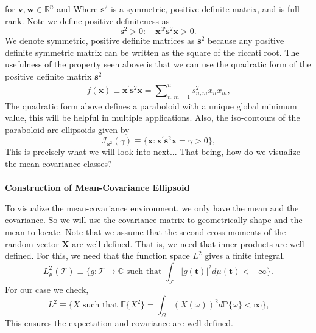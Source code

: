 \documentclass[../main.tex]{subfiles}
\begin{document}
for $\mathbf{v,w} \in \mathbb{R}^n$ and Where
$\mathbf{s}^2$ is a symmetric, positive definite matrix, and 
is full rank. Note we define positive definiteness as
\[
\mathbf{s}^2 > 0: \quad \mathbf{x^T}\mathbf{s}^2\mathbf{x} > 0.
\]
We denote symmetric, positive definite matrices
as $\mathbf{s}^2$ because any positive definite symmetric 
matrix can be written as the square of the riccati root. 
The usefulness of the property seen above is 
that we can use the quadratic form of the positive definite matrix $\mathbf{s}^2$
\begin{equation}
    f(\boldsymbol{x})\equiv\boldsymbol{x}^{\prime}\boldsymbol{s}^{2}\boldsymbol{x}={\textstyle\sum\nolimits_{n,m=1}^{\bar{n}}} s_{n,m}^{2}x_{n}x_{m}\text{,}
    \end{equation}
The quadratic form above defines a paraboloid
with a unique global minimum value, this will
be helpful in multiple applications.
Also, the iso-contours of the paraboloid
are ellipsoids given by 
\begin{equation}
    \mathcal{I}_{\boldsymbol{s}^{2}}(\gamma)\equiv\{\boldsymbol{x}:\boldsymbol{x}^{\prime}\boldsymbol{s}^{2}\boldsymbol{x}=\gamma > 0\}\text{,}
    \end{equation}
This is precisely what we will look into next... That being, how do we visualize
the mean covariance classes?\\
\\ \textbf{Construction of Mean-Covariance Ellipsoid}\\
\par To visualize the mean-covariance 
environment, we only have the mean and the covariance. 
So we will use the covariance matrix to geometrically shape and
the mean to locate. Note that we assume that the second cross moments of the random vector 
$\mathbf{X}$ are well defined. That is, we need
that inner products are well defined. For this, 
we need that the function space $L^2$ gives a finite integral.
\begin{equation}
    L_{\mu}^{2}(\mathcal{T})\equiv\{g:\mathcal{T}\rightarrow\mathbb{C}\text{ such that }\int_{\mathcal{T}}|g(\boldsymbol{t})|^{2}d\mu(\boldsymbol{t})<+\infty\}\text{.}
    \end{equation}
For our case we check,
\begin{equation}
    L^{2}\equiv\{X\text{ such that }\mathbb{E}\{X^{2}\}=\int_{\Omega}(X(\omega))^{2}d\mathbb{P}\{\omega\}<\infty\}\text{,}
    \end{equation}
This ensures the expectation and covariance are well defined. 
\end{document}
